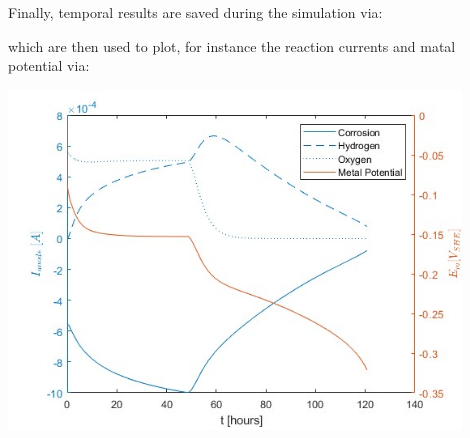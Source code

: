 \documentclass[3p]{elsarticle} %
\begin{document}
Finally, temporal results are saved during the simulation via:

which are then used to plot, for instance the reaction currents and matal potential via:

\begin{center}
\includegraphics[width=12cm]{../Figures/Lines.jpg}
\end{center}


\end{document}
